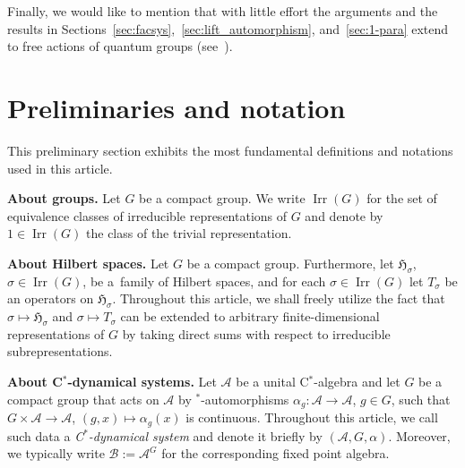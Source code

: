 \documentclass[pdftex]{sigma}
\numberwithin{equation}{section}
\newcommand*{\Star}{$^*$\nobreakdash}
\newcommand*{\hilb}{\mathfrak}		%
\newcommand*{\alg}{\mathcal}		%
\newcommand*{\hH}{\hilb{H}}			%
\newcommand*{\aA}{\alg{A}}			%
\newcommand*{\aB}{\alg{B}} 			%
\DeclareMathOperator{\Irrep}{Irr} 			%
\begin{document}
Finally, we would like to mention that with little effort the arguments and the results in Sections~\ref{sec:facsys},~\ref{sec:lift_automorphism}, and~\ref{sec:1-para} extend to free actions of quantum groups (see~\cite{SchWa17c}).
	
\section{Preliminaries and notation}\label{sec:pre}

This preliminary section exhibits the most fundamental definitions and notations used in this article.

{\bf About groups.}
Let $G$ be a compact group.
We write $\Irrep(G)$ for the set of equivalence classes of irreducible representations of $G$ and denote by $1 \in \Irrep(G)$ the class of the trivial representation.

{\bf About Hilbert spaces.}
Let $G$ be a compact group.
Furthermore, let $\hH_\sigma$, $\sigma \in \Irrep(G)$, be a~family of Hilbert spaces, and for each $\sigma \in \Irrep(G)$ let $T_\sigma$ be an operators on $\hH_\sigma$.
Throughout this article, we shall freely utilize the fact that $\sigma \mapsto \hH_\sigma$ and $\sigma \mapsto T_\sigma$ can be extended to arbitrary finite-dimensional representations of $G$ by taking direct sums with respect to irreducible subrepresentations.

{\bf About C\Star-dynamical systems.}
Let $\aA$ be a unital C\Star-algebra and let $G$ be a compact group that acts on $\aA$ by \Star-automorphisms $\alpha_g\colon \aA \to \aA$, $g \in G$, such that $G \times \aA \to \aA$, $(g,x) \mapsto \alpha_g(x)$ is continuous.
Throughout this article, we call such data a \emph{C\Star-dynamical system} and denote it briefly by $(\aA,G,\alpha)$.
Moreover, we typically write $\aB := \aA^G$ for the corresponding fixed point algebra.
\end{document}
